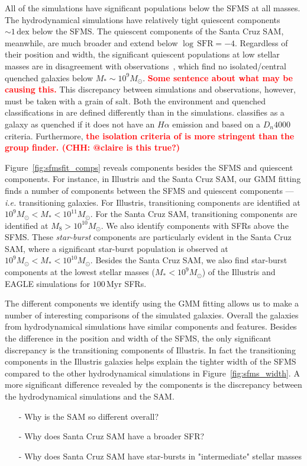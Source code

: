 \documentclass[preprint2,tighten]{aastex62}
\newcommand{\todo}[1]{{\bf \textcolor{red}{ #1}}}
\begin{document}
All of the simulations have significant populations below the SFMS at all 
masses. The hydrodynamical simulations have relatively tight quiescent components 
$\sim 1\,\mathrm{dex}$ below the SFMS. The quiescent components of the 
Santa Cruz SAM, meanwhile, are much broader and extend below 
$\log\,\mathrm{SFR} = -4$. Regardless of their position and width, the 
significant quiescent populations at low stellar masses are in disagreement
with observations~\citep{geha2012}, which find no isolated/central quenched 
galaxies below $M_* \sim 10^9 M_\odot$. 
\todo{Some sentence about what may be causing this.}
This discrepancy between simulations and observations, however, must be 
taken with a grain of salt. Both the environment and quenched classifications 
in \cite{geha2012} are defined differently than in the simulations. 
\cite{geha2012} classifies as a galaxy as quenched if it
does not have an $H\alpha$ emission and based on a $D_n 4000$ criteria. 
Furthermore, \todo{the isolation criteria of \cite{geha2012} is more 
stringent than the group finder. (CHH: @claire is this true?)} 

Figure~\ref{fig:sfmsfit_comps} reveals components besides the SFMS and quiescent
components. For instance, in Illustris and the Santa Cruz SAM, our GMM fitting
finds a number of components between the SFMS and quiescent components ---
\emph{i.e.} transitioning galaxies. For Illustris, transitioning components 
are identified at $10^9 M_\odot < M_* < 10^{11}M_\odot$. For the Santa Cruz SAM, 
transitioning components are identified at $M_8 > 10^{10} M_\odot$. We also 
identify components with SFRs above the SFMS. These \emph{star-burst} 
components are particularly evident in the Santa Cruz SAM, where a significant
star-burst population is observed at $10^9 M_\odot < M_* < 10^{10} M_\odot$. 
Besides the Santa Cruz SAM, we also find star-burst components at the lowest
stellar masses ($M_* < 10^9 M_\odot$) of the Illustris and EAGLE simulations 
for $100\,\mathrm{Myr}$ SFRs. 

The different components we identify using the GMM fitting allows us to make a 
number of interesting comparisons of the simulated galaxies. Overall
the galaxies from hydrodynamical simulations have similar components
and features. Besides the difference in the position and width of the SFMS, 
the only significant discrepancy is the transitioning components of
Illustris. In fact the transitioning components in the Illustris galaxies 
helps explain the tighter width of the SFMS compared to the other hydrodynamical 
simulations in Figure~\ref{fig:sfms_width}. A more significant difference 
revealed by the components is the discrepancy between the hydrodynamical 
simulations and the SAM. 
\begin{itemize}
\item[-] Why is the SAM so different overall?
\item[-] Why does Santa Cruz SAM have a broader SFR? 
\item[-] Why does Santa Cruz SAM have star-bursts in "intermediate" stellar masses
\end{itemize}
\end{document}
